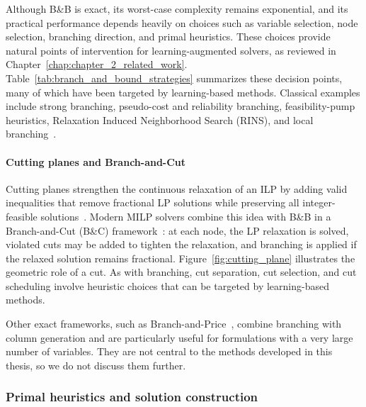 Although B\&B is exact, its worst-case complexity remains exponential, and its practical performance depends heavily on choices such as variable selection, node selection, branching direction, and primal heuristics. These choices provide natural points of intervention for learning-augmented solvers, as reviewed in Chapter~\ref{chap:chapter_2_related_work}. Table~\ref{tab:branch_and_bound_strategies} summarizes these decision points, many of which have been targeted by learning-based methods. Classical examples include strong branching, pseudo-cost and reliability branching, feasibility-pump heuristics, Relaxation Induced Neighborhood Search (RINS), and local branching~\cite{achterberg_branching_2005,benichou_experiments_1971,fischetti_feasibility_2005,danna_exploring_2005,fischetti_local_2003}.





\paragraph{Cutting planes and Branch-and-Cut}
Cutting planes strengthen the continuous relaxation of an ILP by adding valid inequalities that remove fractional LP solutions while preserving all integer-feasible solutions~\cite{gomory_outline_1958}. Modern MILP solvers combine this idea with B\&B in a Branch-and-Cut (B\&C) framework~\cite{balas_mixed_1996,cochran_branch_2011}: at each node, the LP relaxation is solved, violated cuts may be added to tighten the relaxation, and branching is applied if the relaxed solution remains fractional. Figure~\ref{fig:cutting_plane} illustrates the geometric role of a cut. As with branching, cut separation, cut selection, and cut scheduling involve heuristic choices that can be targeted by learning-based methods. 

Other exact frameworks, such as Branch-and-Price~\cite{barnhart_branch-and-price_1998,cochran_branchpriceandcut_2011}, combine branching with column generation and are particularly useful for formulations with a very large number of variables. They are not central to the methods developed in this thesis, so we do not discuss them further.



\subsubsection{Primal heuristics and solution construction}

